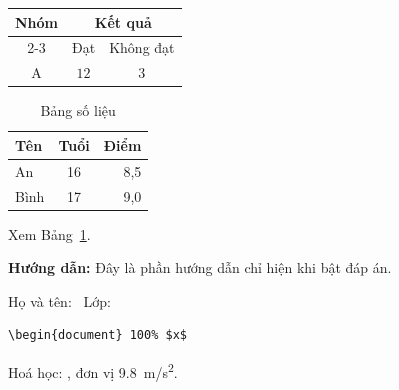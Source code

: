 \documentclass[12pt,a4paper]{article}
\newenvironment{khunglg}{\par\noindent\textbf{Hướng dẫn:}}{\par}
\newif\ifdapan \dapantrue
\begin{document}
\begin{center}
\begin{tabular}{|c|c|c|}
\hline
\multirow{2}{*}{Nhóm} & \multicolumn{2}{c|}{Kết quả} \\
\cline{2-3}
 & Đạt & Không đạt \\
\hline
A & $12$ & $3$ \\
\hline
\end{tabular}
\end{center}

\begin{table}[h]
\centering
\caption{Bảng số liệu}\label{tab:1}
\begin{tabular}{lcr}
\toprule
\textbf{Tên} & Tuổi & Điểm \\
\midrule
An & 16 & 8,5 \\
Bình & 17 & 9,0 \\
\bottomrule
\end{tabular}
\end{table}
Xem Bảng~\ref{tab:1}.

\ifdapan
\begin{khunglg}
Đây là phần hướng dẫn chỉ hiện khi bật đáp án.
\end{khunglg}
\fi

Họ và tên: \dotfill\ Lớp: \hrulefill

\begin{verbatim}
\begin{document} 100% $x$
\end{verbatim}

Hoá học: , đơn vị \SI{9.8}{m/s^2}.
\end{document}
